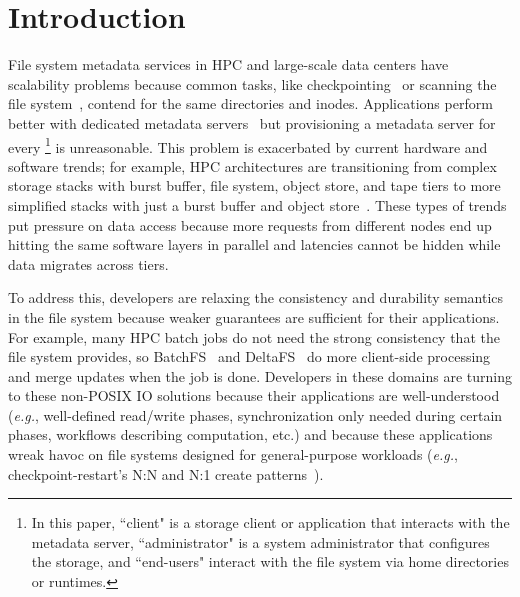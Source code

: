 \section{Introduction}

File system metadata services in HPC and large-scale data centers have
scalability problems because common tasks, like
checkpointing~\cite{bent_plfs_2009} or scanning the file
system~\cite{zheng:pdsw2014-batchfs}, contend for the same directories and
inodes. Applications perform better with dedicated metadata
servers~\cite{sevilla:sc15-mantle, ren:sc2014-indexfs} but provisioning a
metadata server for every \footnote{In this paper, ``client"
is a storage client or application that interacts with the metadata server,
``administrator" is a system administrator that configures the storage, and
``end-users" interact with the file system via home directories or runtimes.  }
is unreasonable. This problem is exacerbated by current hardware and software
trends; for example,  HPC architectures are transitioning from complex storage
stacks with burst buffer, file system, object store, and tape tiers to more
simplified stacks with just a burst buffer and object
store~\cite{bent:login16-hpc-trends}. These types of trends put pressure on
data access because more requests from different nodes end up hitting the same
software layers in parallel and latencies cannot be hidden while data migrates
across tiers.

To address this, developers are relaxing the consistency and durability
semantics in the file system because weaker guarantees are sufficient for their
applications. For example, many HPC batch jobs do not need the strong
consistency that the file system provides, so
BatchFS~\cite{zheng:pdsw2014-batchfs} and DeltaFS~\cite{zheng:pdsw2015-deltafs}
do more client-side processing and merge updates when the job is done.
Developers in these domains are turning to these non-POSIX IO solutions because
their applications are well-understood ({\it e.g.}, well-defined read/write
phases, synchronization only needed during certain phases, workflows describing
computation, etc.) and because these applications wreak havoc on file systems
designed for general-purpose workloads ({\it e.g.}, checkpoint-restart's N:N
and N:1 create patterns~\cite{bent_plfs_2009}).

